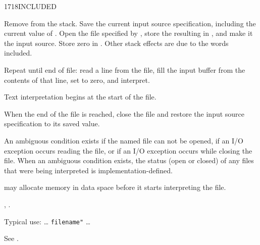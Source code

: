 \begin{worddef}{1718}{INCLUDED}
\item {}

	Remove  from the stack. Save the current input
	source specification, including the current value of
	. Open the file specified by ,
	store the resulting  in , and make
	it the input source. Store zero in . Other
	stack effects are due to the words included.

	Repeat until end of file: read a line from the file, fill the
	input buffer from the contents of that line, set 
	to zero, and interpret.

	Text interpretation begins at the start of the file.

	When the end of the file is reached, close the file and restore
	the input source specification to its saved value.

	An ambiguous condition exists if the named file can not be
	opened, if an I/O exception occurs reading the file, or if an
	I/O exception occurs while closing the file. When an ambiguous
	condition exists, the status (open or closed) of any files that
	were being interpreted is implementation-defined.

	 may allocate memory in data space before it
	starts interpreting the file.

\see {},
	.

	\begin{rationale} %
		Typical use:
			{\ldots}  \texttt{filename"}  {\ldots}
	\end{rationale}

	\begin{testing} %
		See .
	\end{testing}
\end{worddef}


